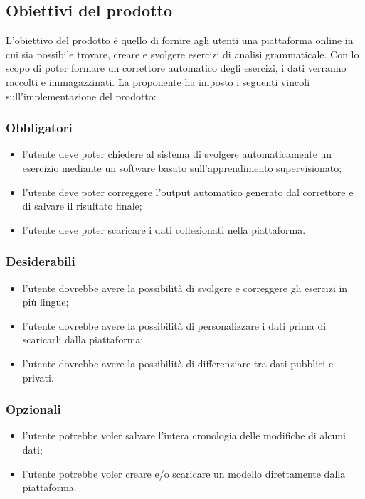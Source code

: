 \subsection{Obiettivi del prodotto}
	L'obiettivo del prodotto è quello di fornire agli utenti una piattaforma online in cui sia possibile trovare, creare e svolgere esercizi di analisi grammaticale. 
Con lo scopo di poter formare un correttore automatico degli esercizi, i dati verranno raccolti e immagazzinati. 
La proponente ha imposto i seguenti vincoli sull'implementazione del prodotto:

\subsubsection{Obbligatori}
\begin{itemize}
	\item l'utente deve poter chiedere al sistema di svolgere automaticamente un esercizio mediante un software basato sull'apprendimento supervisionato;
	\item l'utente deve poter correggere l'output automatico generato dal correttore e di salvare il risultato finale;
	\item l'utente deve poter scaricare i dati collezionati nella piattaforma.
\end{itemize}
\subsubsection{Desiderabili}
\begin{itemize}
	\item l'utente dovrebbe avere la possibilità di svolgere e correggere gli esercizi in più lingue;
	\item l'utente dovrebbe avere la possibilità di personalizzare i dati prima di scaricarli dalla piattaforma;
	\item l'utente dovrebbe avere la possibilità di differenziare tra dati pubblici e privati.
\end{itemize}
\subsubsection{Opzionali}
\begin{itemize}
	\item l'utente potrebbe voler salvare l'intera cronologia delle modifiche di alcuni dati;
	\item l'utente potrebbe voler creare e/o scaricare un modello direttamente dalla piattaforma.
\end{itemize}

